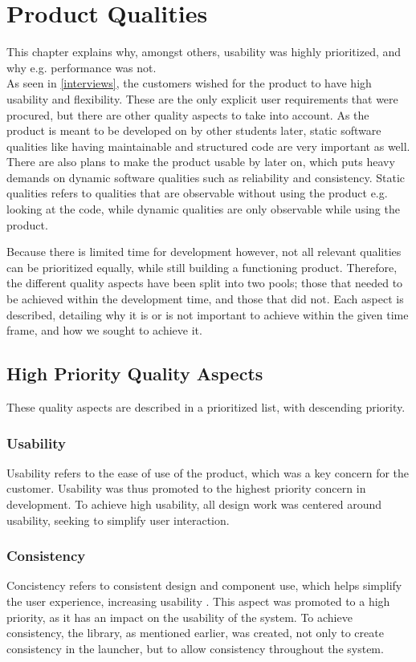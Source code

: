 \chapter{Product Qualities}
\label{product_quality}
This chapter explains why, amongst others, usability was highly prioritized, and why e.g. performance was not.\\

As seen in \autoref{interviews}, the customers wished for the product to have high usability and flexibility. 
These are the only explicit user requirements that were procured, but there are other quality aspects to take into account. 
As the product is meant to be developed on by other students later, static software qualities like having maintainable and structured code are very important as well. 
There are also plans to make the product usable by \autists[] later on, which puts heavy demands on dynamic software qualities such as reliability and consistency. 
Static qualities refers to qualities that are observable without using the product e.g. looking at the code, while dynamic qualities are only observable while using the product.\newline

Because there is limited time for development however, not all relevant qualities can be prioritized equally, while still building a functioning product. 
Therefore, the different quality aspects have been split into two pools; those that needed to be achieved within the development time, and those that did not. 
Each aspect is described, detailing why it is or is not important to achieve within the given time frame, and how we sought to achieve it. 

\section{High Priority Quality Aspects}
These quality aspects are described in a prioritized list, with descending priority. 

\subsection*{Usability}
Usability refers to the ease of use of the product, which was a key concern for the customer.
Usability was thus promoted to the highest priority concern in development. 
To achieve high usability, all design work was centered around usability, seeking to simplify user interaction. 

\subsection*{Consistency}
Concistency refers to consistent design and component use, which helps simplify the user experience, increasing usability \citep[p. 90]{dieb-book}. 
This aspect was promoted to a high priority, as it has an impact on the usability of the system. 
To achieve consistency, the \guicomponents[] library, as mentioned earlier, was created, not only to create consistency in the launcher, but to allow consistency throughout the system. 

